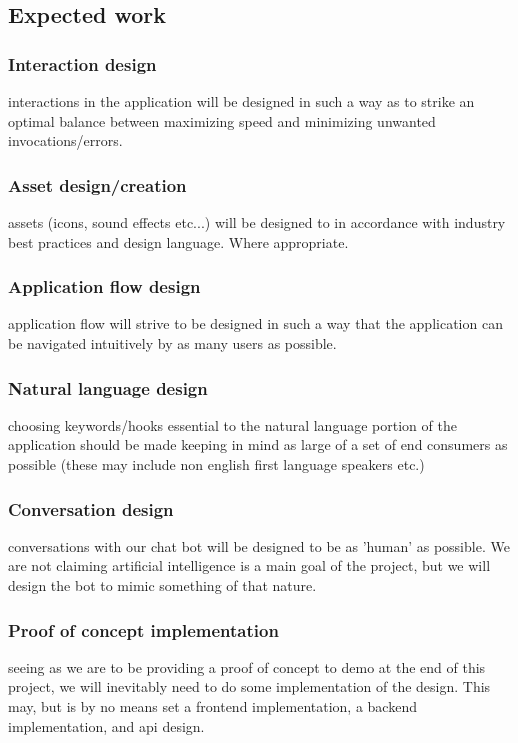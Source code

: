 \documentclass{sigchi}
\begin{document}
\subsection{Expected work}

\subsubsection{Interaction design}
interactions in the application will be designed in such a way as to strike an optimal balance between maximizing speed and minimizing unwanted invocations/errors.

\subsubsection{Asset design/creation}
assets (icons, sound effects etc...) will be designed to in accordance with industry best practices and design language. Where appropriate.

\subsubsection{Application flow design}
application flow will strive to be designed in such a way that the application can be navigated intuitively by as many users as possible.

\subsubsection{Natural language design}
choosing keywords/hooks essential to the natural language portion of the application should be made keeping in mind as large of a set of end consumers as possible (these may include non english first language speakers etc.)

\subsubsection{Conversation design}
conversations with our chat bot will be designed to be as 'human' as possible. We are not claiming artificial intelligence is a main goal of the project, but we will design the bot to mimic something of that nature.

\subsubsection{Proof of concept implementation}
seeing as we are to be providing a proof of concept to demo at the end of this project, we will inevitably need to do some implementation of the design. This may, but is by no means set a frontend implementation, a backend implementation, and api design.
\end{document}
